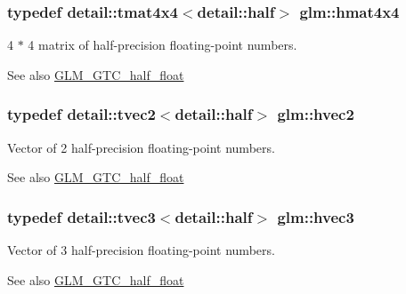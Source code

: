 \subsubsection[{hmat4x4}]{\setlength{\rightskip}{0pt plus 5cm}typedef detail\+::tmat4x4$<$detail\+::half$>$ {\bf glm\+::hmat4x4}}\label{group__gtc__half__float_gabf1d2a56f968368a22222ab03fedf67f}
4 $\ast$ 4 matrix of half-\/precision floating-\/point numbers. \begin{DoxySeeAlso}{See also}
\hyperlink{group__gtc__half__float}{G\+L\+M\+\_\+\+G\+T\+C\+\_\+half\+\_\+float} 
\end{DoxySeeAlso}
\hypertarget{group__gtc__half__float_gafad70a9362e123cafc2807e93c292173}{}
\subsubsection[{hvec2}]{\setlength{\rightskip}{0pt plus 5cm}typedef detail\+::tvec2$<$detail\+::half$>$ {\bf glm\+::hvec2}}\label{group__gtc__half__float_gafad70a9362e123cafc2807e93c292173}
Vector of 2 half-\/precision floating-\/point numbers. \begin{DoxySeeAlso}{See also}
\hyperlink{group__gtc__half__float}{G\+L\+M\+\_\+\+G\+T\+C\+\_\+half\+\_\+float} 
\end{DoxySeeAlso}
\hypertarget{group__gtc__half__float_ga7f3d584efe4e61946fb06ce920b6919f}{}
\subsubsection[{hvec3}]{\setlength{\rightskip}{0pt plus 5cm}typedef detail\+::tvec3$<$detail\+::half$>$ {\bf glm\+::hvec3}}\label{group__gtc__half__float_ga7f3d584efe4e61946fb06ce920b6919f}
Vector of 3 half-\/precision floating-\/point numbers. \begin{DoxySeeAlso}{See also}
\hyperlink{group__gtc__half__float}{G\+L\+M\+\_\+\+G\+T\+C\+\_\+half\+\_\+float} 
\end{DoxySeeAlso}
\hypertarget{group__gtc__half__float_ga377f6d7c1e25bda8eb1393f5cc74acd4}{}
